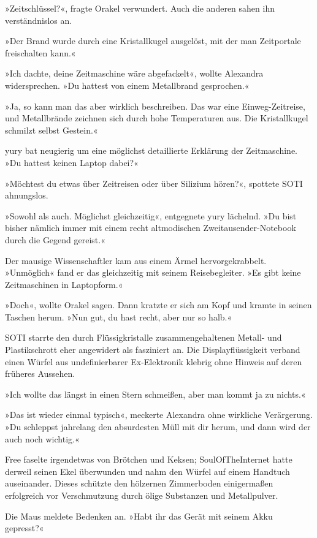 »Zeitschlüssel?«, fragte Orakel verwundert. Auch die anderen sahen ihn verständnislos an.

»Der Brand wurde durch eine Kristallkugel ausgelöst, mit der man Zeitportale freischalten kann.«

»Ich dachte, deine Zeitmaschine wäre abgefackelt«, wollte Alexandra widersprechen. »Du hattest von einem Metallbrand gesprochen.«

»Ja, so kann man das aber wirklich beschreiben. Das war eine Einweg-Zeitreise, und Metallbrände zeichnen sich durch hohe Temperaturen aus. Die Kristallkugel schmilzt selbst Gestein.«

yury bat neugierig um eine möglichst detaillierte Erklärung der Zeitmaschine. »Du hattest keinen Laptop dabei?«

»Möchtest du etwas über Zeitreisen oder über Silizium hören?«, spottete SOTI ahnungslos.

»Sowohl als auch. Möglichst gleichzeitig«, entgegnete yury lächelnd. »Du bist bisher nämlich immer mit einem recht altmodischen Zweitausender-Notebook durch die Gegend gereist.«

Der mausige Wissenschaftler kam aus einem Ärmel hervorgekrabbelt. »Unmöglich« fand er das gleichzeitig mit seinem Reisebegleiter. »Es gibt keine Zeitmaschinen in Laptopform.«

»Doch«, wollte Orakel sagen. Dann kratzte er sich am Kopf und kramte in seinen Taschen herum. »Nun gut, du hast recht, aber nur so halb.«

SOTI starrte den durch Flüssigkristalle zusammengehaltenen Metall- und Plastikschrott eher angewidert als fasziniert an. Die Displayflüssigkeit verband einen Würfel aus undefinierbarer Ex-Elektronik klebrig ohne Hinweis auf deren früheres Aussehen.

»Ich wollte das längst in einen Stern schmeißen, aber man kommt ja zu nichts.«

»Das ist wieder einmal typisch«, meckerte Alexandra ohne wirkliche Verärgerung. »Du schleppst jahrelang den absurdesten Müll mit dir herum, und dann wird der auch noch wichtig.«

Free faselte irgendetwas von Brötchen und Keksen; SoulOfTheInternet hatte derweil seinen Ekel überwunden und nahm den Würfel auf einem Handtuch auseinander. Dieses schützte den hölzernen Zimmerboden einigermaßen erfolgreich vor Verschmutzung durch ölige Substanzen und Metallpulver.

Die Maus meldete Bedenken an. »Habt ihr das Gerät mit seinem Akku gepresst?«

